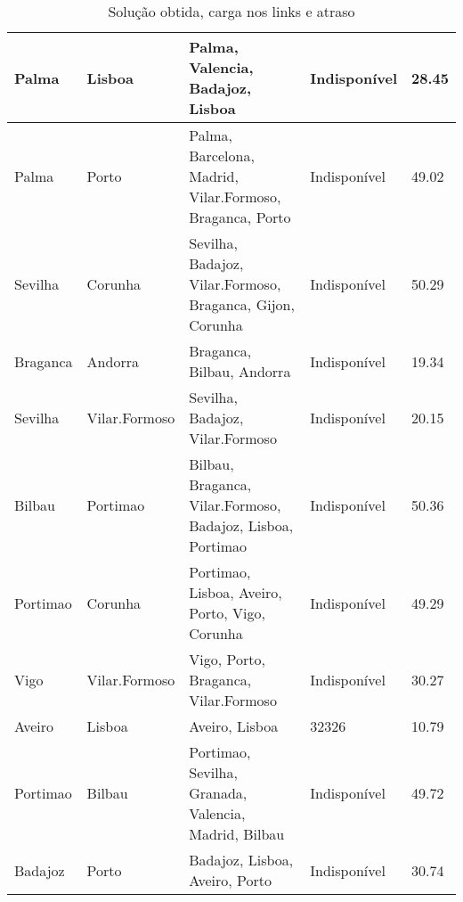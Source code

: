 \begin{table}[!htb]
{\begin{tabular}{|l|l|l|l|l|}
Palma & Lisboa & Palma, Valencia, Badajoz, Lisboa & Indisponível & 28.45 \\ \hline
Palma & Porto & Palma, Barcelona, Madrid, Vilar.Formoso, Braganca, Porto & Indisponível & 49.02 \\ \hline
Sevilha & Corunha & Sevilha, Badajoz, Vilar.Formoso, Braganca, Gijon, Corunha & Indisponível & 50.29 \\ \hline
Braganca & Andorra & Braganca, Bilbau, Andorra & Indisponível & 19.34 \\ \hline
Sevilha & Vilar.Formoso & Sevilha, Badajoz, Vilar.Formoso & Indisponível & 20.15 \\ \hline
Bilbau & Portimao & Bilbau, Braganca, Vilar.Formoso, Badajoz, Lisboa, Portimao & Indisponível & 50.36 \\ \hline
Portimao & Corunha & Portimao, Lisboa, Aveiro, Porto, Vigo, Corunha & Indisponível & 49.29 \\ \hline
Vigo & Vilar.Formoso & Vigo, Porto, Braganca, Vilar.Formoso & Indisponível & 30.27 \\ \hline
Aveiro & Lisboa & Aveiro, Lisboa & 32326 & 10.79 \\ \hline
Portimao & Bilbau & Portimao, Sevilha, Granada, Valencia, Madrid, Bilbau & Indisponível & 49.72 \\ \hline
Badajoz & Porto & Badajoz, Lisboa, Aveiro, Porto & Indisponível & 30.74 \\ \hline
\end{tabular}}
\caption[]{Solução obtida, carga nos links e atraso}
\end{table}


